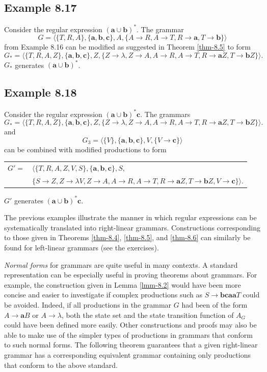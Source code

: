 \subsection*{Example 8.17}

Consider the regular expression $(\pmb{a}\cup\pmb{b})^*$. The grammar
\[ G=\langle\{T,R,A\},\{\pmb{a},\pmb{b},\pmb{c}\},A,\{A\rightarrow R,A
	\rightarrow T,R\rightarrow\pmb{a},T\rightarrow\pmb{b}\}\rangle \]
from Example 8.16 can be modified as suggested in Theorem \ref{thm-8.5} to form
\[ G_* = \langle\{T,R,A,Z\},\{\pmb{a},\pmb{b},\pmb{c}\},Z,\{Z\rightarrow\lambda,
	Z\rightarrow A,A\rightarrow R,A\rightarrow T,R\rightarrow\pmb{a}Z,T
	\rightarrow\pmb{b}Z\}\rangle. \]
$G_*$ generates $(\pmb{a}\cup\pmb{b})^*$.

\subsection*{Example 8.18}

Consider the regular expression $(\pmb{a}\cup\pmb{b})^*\pmb{c}$. The grammars
\[ G_* = \langle\{T,R,A,Z\},\{\pmb{a},\pmb{b},\pmb{c}\},Z,\{Z\rightarrow\lambda,
	Z\rightarrow A,A\rightarrow R,A\rightarrow T,R\rightarrow\pmb{a}Z,T
	\rightarrow\pmb{b}Z\}\rangle. \]
and
\[ G_3 = \langle\{V\},\{\pmb{a},\pmb{b},\pmb{c}\},V,\{V\rightarrow\pmb{c}\}
	\rangle \]
can be combined with modified productions to form
\begin{center}\begin{tabular}{r@{ }l}
$G' =$ & $\langle\{T,R,A,Z,V,S\},\{\pmb{a},\pmb{b},\pmb{c}\},S,$ \\
& $\{S\rightarrow Z,Z\rightarrow \lambda V,Z\rightarrow A,A\rightarrow R,A
	\rightarrow T,R\rightarrow\pmb{a}Z,T\rightarrow\pmb{b}Z,V\rightarrow
	\pmb{c}\}\rangle$.
\end{tabular}\end{center}
$G'$ generates $(\pmb{a}\cup\pmb{b})^*\pmb{c}$.

The previous examples illustrate the manner in which regular expressions can
be systematically translated into right-linear grammars. Constructions
corresponding to those given in Theorems \ref{thm-8.4}, \ref{thm-8.5}, and \ref{thm-8.6} can similarly be
found for left-linear grammars (see the exercises).

\emph{Normal forms} for grammars are quite useful in many contexts. A standard
representation can be especially useful in proving theorems about grammars. For
example, the construction given in Lemma \ref{lmm-8.2} would have been more concise and
easier to investigate if complex productions such as $S\rightarrow\pmb{bcaa}T$
could be avoided. Indeed, if all productions in the grammar $G$ had been of the
form $A\rightarrow\pmb{a}B$ or $A\rightarrow\lambda$, both the state set and the
state transition function of $A_G$ could have been defined more easily. Other
constructions and proofs may also be able to make use of the simpler types of
productions in grammars that conform to such normal forms. The following theorem
guarantees that a given right-linear grammar has a corresponding equivalent
grammar containing only productions that conform to the above standard.

